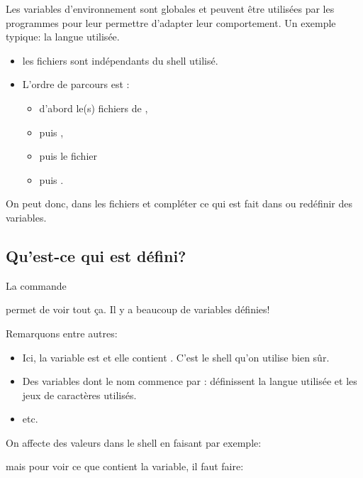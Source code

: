 Les variables d'environnement sont globales et peuvent être utilisées
par les programmes pour leur permettre d'adapter leur
comportement. Un exemple typique: la langue utilisée.

\begin{itemize}
  \item les fichiers  sont indépendants du shell utilisé.
  \item L'ordre de parcours est :
    \begin{itemize}
    \item d'abord le(s) fichiers  de ,
    \item puis ,
    \item puis le fichier 
    \item puis .
    \end{itemize}
\end{itemize}

On peut donc, dans les fichiers   et 
compléter ce qui est fait dans  ou redéfinir des variables.

\subsection*{Qu'est-ce qui est défini?}

La commande


permet de voir tout ça. Il y a beaucoup de variables définies!

Remarquons entre autres:

\begin{itemize}
\item {}

  Ici, la variable est  et elle contient
  . C'est le shell qu'on utilise bien sûr.
\item Des variables dont le nom commence par : définissent la
  langue utilisée et les jeux de caractères utilisés.
\item etc.
\end{itemize}

On affecte des valeurs dans le shell en faisant par exemple:


mais pour voir ce que contient la variable, il faut faire:


